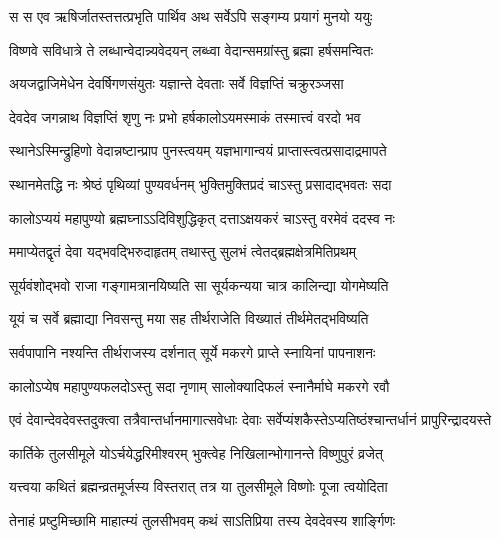 \twolineshloka
{स स एव ऋषिर्जातस्तत्तत्प्रभृति पार्थिव}
{अथ सर्वेऽपि सङ्गम्य प्रयागं मुनयो ययुः} %

\twolineshloka
{विष्णवे सविधात्रे ते लब्धान्वेदान्न्यवेदयन्}
{लब्ध्वा वेदान्समग्रांस्तु ब्रह्मा हर्षसमन्वितः} %

\twolineshloka
{अयजद्वाजिमेधेन देवर्षिगणसंयुतः}
{यज्ञान्ते देवताः सर्वे विज्ञप्तिं चक्रुरञ्जसा} %


\twolineshloka
{देवदेव जगन्नाथ विज्ञप्तिं शृणु नः प्रभो}
{हर्षकालोऽयमस्माकं तस्मात्त्वं वरदो भव} %

\twolineshloka
{स्थानेऽस्मिन्द्रुहिणो वेदान्नष्टान्प्राप पुनस्त्वयम्}
{यज्ञभागान्वयं प्राप्तास्त्वत्प्रसादाद्रमापते} %

\twolineshloka
{स्थानमेतद्धि नः श्रेष्ठं पृथिव्यां पुण्यवर्धनम्}
{भुक्तिमुक्तिप्रदं चाऽस्तु प्रसादाद्भवतः सदा} %

\twolineshloka
{कालोऽप्ययं महापुण्यो ब्रह्मघ्नाऽऽदिविशुद्धिकृत्}
{दत्ताऽक्षयकरं चाऽस्तु वरमेवं ददस्व नः} %


\twolineshloka
{ममाप्येतद्वृतं देवा यद्भवद्भिरुदाहृतम्}
{तथास्तु सुलभं त्वेतद्ब्रह्मक्षेत्रमितिप्रथम्} %

\twolineshloka
{सूर्यवंशोद्भवो राजा गङ्गामत्रानयिष्यति}
{सा सूर्यकन्यया चात्र कालिन्द्या योगमेष्यति} %

\twolineshloka
{यूयं च सर्वे ब्रह्माद्या निवसन्तु मया सह}
{तीर्थराजेति विख्यातं तीर्थमेतद्भविष्यति} %

\twolineshloka
{सर्वपापानि नश्यन्ति तीर्थराजस्य दर्शनात्}
{सूर्ये मकरगे प्राप्ते स्नायिनां पापनाशनः} %

\twolineshloka
{कालोऽप्येष महापुण्यफलदोऽस्तु सदा नृणाम्}
{सालोक्यादिफलं स्नानैर्माघे मकरगे रवौ} %

\twolineshloka
{एवं देवान्देवदेवस्तदुक्त्वा तत्रैवान्तर्धानमागात्सवेधाः}
{देवाः सर्वेप्यंशकैस्तेऽप्यतिष्ठंश्चान्तर्धानं प्रापुरिन्द्रादयस्ते} %

\twolineshloka
{कार्तिके तुलसीमूले योऽर्चयेद्धरिमीश्वरम्}
{भुक्त्वेह निखिलान्भोगानन्ते विष्णुपुरं व्रजेत्} %





\twolineshloka
{यत्त्वया कथितं ब्रह्मन्व्रतमूर्जस्य विस्तरात्}
{तत्र या तुलसीमूले विष्णोः पूजा त्वयोदिता} %

\twolineshloka
{तेनाहं प्रष्टुमिच्छामि माहात्म्यं तुलसीभवम्}
{कथं साऽतिप्रिया तस्य देवदेवस्य शार्ङ्गिणः} %

